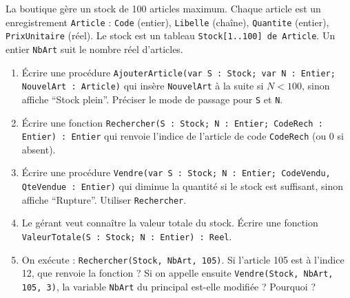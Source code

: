 \documentclass[11pt]{article}
\begin{document}
\begin{exercice}
La boutique gère un stock de 100 articles maximum. Chaque article est un enregistrement \texttt{Article} : \texttt{Code} (entier), \texttt{Libelle} (chaîne), \texttt{Quantite} (entier), \texttt{PrixUnitaire} (réel). Le stock est un tableau \texttt{Stock[1..100] de Article}. Un entier \texttt{NbArt} suit le nombre réel d'articles.
\begin{enumerate}
    \item Écrire une procédure \texttt{AjouterArticle(var S : Stock; var N : Entier; NouvelArt : Article)} qui insère \texttt{NouvelArt} à la suite si $N < 100$, sinon affiche ``Stock plein''. Préciser le mode de passage pour \texttt{S} et \texttt{N}.
    \item Écrire une fonction \texttt{Rechercher(S : Stock; N : Entier; CodeRech : Entier) : Entier} qui renvoie l'indice de l'article de code \texttt{CodeRech} (ou 0 si absent).
    \item Écrire une procédure \texttt{Vendre(var S : Stock; N : Entier; CodeVendu, QteVendue : Entier)} qui diminue la quantité si le stock est suffisant, sinon affiche ``Rupture''. Utiliser \texttt{Rechercher}.
    \item Le gérant veut connaître la valeur totale du stock. Écrire une fonction \texttt{ValeurTotale(S : Stock; N : Entier) : Reel}.
    \item On exécute : \texttt{Rechercher(Stock, NbArt, 105)}. Si l'article 105 est à l'indice 12, que renvoie la fonction ? Si on appelle ensuite \texttt{Vendre(Stock, NbArt, 105, 3)}, la variable \texttt{NbArt} du principal est-elle modifiée ? Pourquoi ?
\end{enumerate}
\end{exercice}
\end{document}
